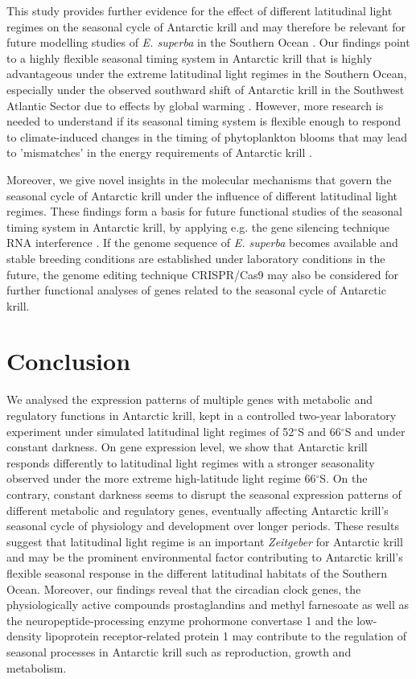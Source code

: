 This study provides further evidence for the effect of different latitudinal
light regimes on the seasonal cycle of Antarctic krill and may therefore be
relevant for future modelling studies of \textit{E. superba} in the Southern
Ocean \citep{horing_light_2018}. Our findings point to a highly flexible
seasonal timing system in Antarctic krill that is highly advantageous under the
extreme latitudinal light regimes in the Southern Ocean, especially under the
observed southward shift of Antarctic krill in the Southwest Atlantic Sector
due to effects by global warming \citep{atkinson_krill_2019}. However, more
research is needed to understand if its seasonal timing system is flexible
enough to respond to climate-induced changes in the timing of phytoplankton
blooms that may lead to 'mismatches' in the energy requirements of Antarctic
krill \citep{durant_climate_2007}. 

Moreover, we give novel insights in the molecular mechanisms that govern the
seasonal cycle of Antarctic krill under the influence of different latitudinal
light regimes. These findings form a basis for future functional studies of the
seasonal timing system in Antarctic krill, by applying e.g. the gene silencing
technique RNA interference \citep{hannon_rna_2002}. If the genome sequence of
\textit{E. superba} becomes available and stable breeding conditions are
established under laboratory conditions in the future, the genome editing
technique CRISPR/Cas9 \citep{sander_crispr-cas_2014} may also be considered for
further functional analyses of genes related to the seasonal cycle of Antarctic
krill.

\section{Conclusion}

We analysed the expression patterns of multiple genes with metabolic and
regulatory functions in Antarctic krill, kept in a controlled two-year
laboratory experiment under simulated latitudinal light regimes of 52$^{\circ}$S
and 66$^{\circ}$S and under constant darkness. On gene expression level, we show
that Antarctic krill responds differently to latitudinal light regimes with a
stronger seasonality observed under the more extreme high-latitude light regime
66$^{\circ}$S. On the contrary, constant darkness seems to disrupt the seasonal
expression patterns of different metabolic and regulatory genes, eventually
affecting Antarctic krill's seasonal cycle of physiology and development over
longer periods. These results suggest that latitudinal light regime is an
important \textit{Zeitgeber} for Antarctic krill and may be the prominent
environmental factor contributing to Antarctic krill's flexible seasonal
response in the different latitudinal habitats of the Southern Ocean. Moreover,
our findings reveal that the circadian clock genes, the physiologically active
compounds prostaglandins and methyl farnesoate as well as the
neuropeptide-processing enzyme prohormone convertase 1 and the low-density
lipoprotein receptor-related protein 1 may contribute to the regulation of
seasonal processes in Antarctic krill such as reproduction, growth and
metabolism.

